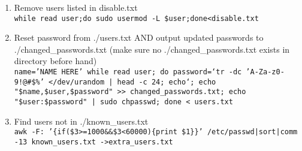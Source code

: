 \documentclass[12pt,letterpaper]{article}
\def\code#1{\textcolor{c2}{\texttt{#1}}}
\begin{document}
\begin{enumerate}
	\item Remove users listed in disable.txt \\
		\code{while read user;do sudo usermod -L \$user;done<disable.txt}
	\item Reset password from ./users.txt AND output updated passwords to ./changed\_passwords.txt (make sure no ./changed\_passwords.txt exists in directory before hand) \\
		\code{name='NAME HERE' while read user; do password=`tr -dc 'A-Za-z0-9!@\#\$\%' </dev/urandom | head -c 24; echo`; echo "\$name,\$user,\$password" >> changed\_passwords.txt; echo "\$user:\$password" | sudo chpasswd; done < users.txt}
	\item Find users not in ./known\_users.txt \\
		\code{awk -F: '\{if(\$3>=1000\&\&\$3<60000)\{print \$1\}\}' /etc/passwd|sort|comm -13 known\_users.txt ->extra\_users.txt}
\end{enumerate}
\end{document}
